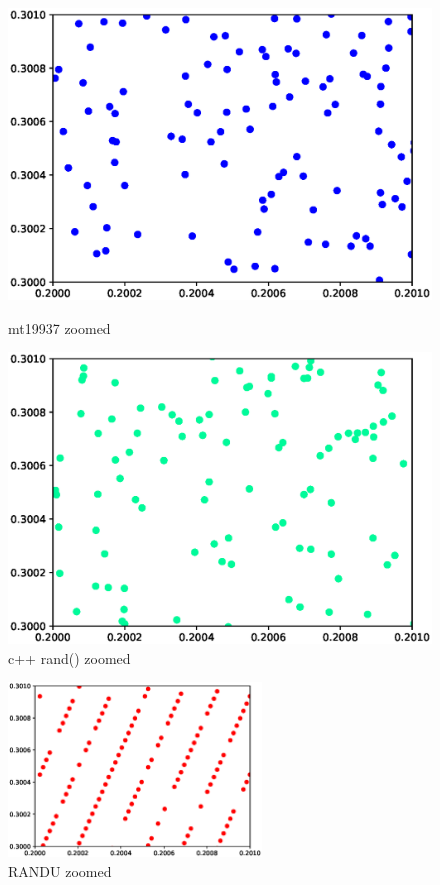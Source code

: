 \documentclass[12pt]{article}
\begin{document}
\begin{figure}[h]
    \centering
    \begin{minipage}{0.47\textwidth}
        \includegraphics[width=1.2\textwidth]{figures/mt19937_zoomed.eps}
        \caption{mt19937 zoomed}
    \end{minipage}
    \hfill
    \begin{minipage}{0.47\textwidth}
        \includegraphics[width=1.2\textwidth]{figures/builtin_zoomed.eps}
        \caption{c++ rand() zoomed}
    \end{minipage}
\end{figure}
\begin{figure}[h]
    \centering
    \includegraphics[width=0.6\textwidth]{figures/randu_zoomed.eps}
    \caption{RANDU zoomed}
\end{figure}
\end{document}
